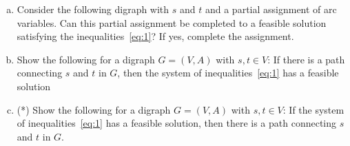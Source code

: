 \begin{enumerate}[1)]
  \begin{enumerate}[a)] 
  \item Consider the following digraph with $s$ and $t$ and a partial assignment of arc variables. Can this partial assignment be completed to a feasible solution satisfying the inequalities~\eqref{eq:1}? If yes, complete the assignment.
    \begin{center}
             
    \end{center}
\item Show the following for a digraph $G = (V,A)$ with $s,t ∈ V$: If there is a path connecting $s$ and $t$ in $G$, then the system of inequalities~\eqref{eq:1} has a feasible solution
  \item (*)  Show the following for a digraph $G = (V,A)$ with $s,t ∈ V$: If  the system of inequalities~\eqref{eq:1} has a feasible solution, then  there is a path connecting $s$ and $t$ in $G$. 
   \end{enumerate}
  
\end{enumerate}



 


